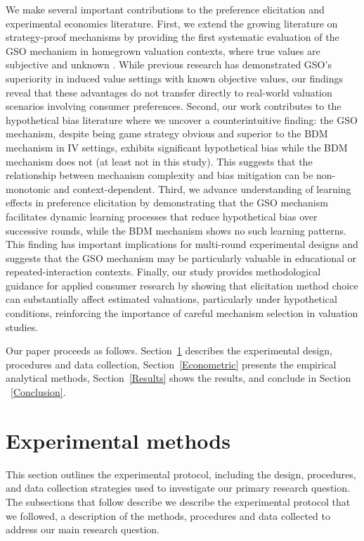 \documentclass[12pt]{article}
\begin{document}
We make several important contributions to the preference elicitation and experimental economics literature. First, we extend the growing literature on strategy-proof mechanisms by providing the first systematic evaluation of the GSO mechanism in homegrown valuation contexts, where true values are subjective and unknown \citep{li_obviously_2017, pycia_theory_2023, chakraborty_future_2025}. While previous research has demonstrated GSO's superiority in induced value settings with known objective values, our findings reveal that these advantages do not transfer directly to real-world valuation scenarios involving consumer preferences. Second, our work contributes to the hypothetical bias literature \citep{penn2018understanding, cummings1999unbiased, loomis_whats_2011, fang_use_2021, list2001explicit, grebitus2013explaining} where we uncover a counterintuitive finding: the GSO mechanism, despite being game strategy obvious and superior to the BDM mechanism in IV settings, exhibits significant hypothetical bias while the BDM mechanism does not (at least not in this study). This suggests that the relationship between mechanism complexity and bias mitigation can be non-monotonic and context-dependent. Third, we advance understanding of learning effects in preference elicitation \citep{drichoutis2011role, canavari2019run} by demonstrating that the GSO mechanism facilitates dynamic learning processes that reduce hypothetical bias over successive rounds, while the BDM mechanism shows no such learning patterns. This finding has important implications for multi-round experimental designs and suggests that the 
GSO mechanism may be particularly valuable in educational or repeated-interaction contexts. Finally, our study provides methodological guidance for applied consumer research by showing that elicitation method choice can substantially affect estimated valuations, particularly under hypothetical conditions, reinforcing the importance of careful mechanism selection in valuation studies\citep{miller2011should, schmidt2020accurately}.

Our paper proceeds as follows. Section~\ref{Experiment} describes the experimental design, procedures and data collection, Section~\ref{Econometric} presents the empirical analytical methods, Section~\ref{Results} shows the results, and conclude in Section ~\ref{Conclusion}.

\section{Experimental methods}
\label{Experiment}
This section outlines the experimental protocol, including the design, procedures, and data collection strategies used to investigate our primary research question. The subsections that follow describe we describe the experimental protocol that we followed, a description of the methods, procedures and data collected to address our main research question. 
\end{document}
